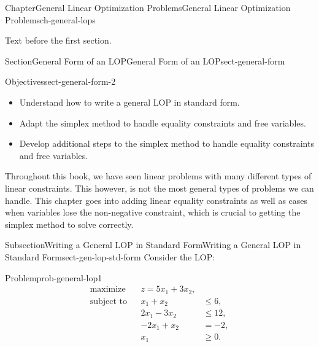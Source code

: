 \documentclass[oneside,10pt,]{book}
\numberwithin{equation}{section}
\newcommand{\amp}{&}
\begin{document}
\begin{chapterptx}{Chapter}{General Linear Optimization Problems}{}{General Linear Optimization Problems}{}{}{ch-general-lops}
\renewcommand*{\chaptername}{Chapter}
\begin{introduction}{}%
Text before the first section.%
\end{introduction}%
%
%
\typeout{************************************************}
\typeout{************************************************}
%
\begin{sectionptx}{Section}{General Form of an LOP}{}{General Form of an LOP}{}{}{sect-general-form}
\begin{objectives}{Objectives}{sect-general-form-2}
%
\begin{itemize}[label=\textbullet]
\item{}Understand how to write a general LOP in standard form.%
\item{}Adapt the simplex method to handle equality constraints and free variables.%
\item{}Develop additional steps to the simplex method to handle equality constraints and free variables.%
\end{itemize}
\end{objectives}
\begin{introduction}{}%
Throughout this book, we have seen linear problems with many different types of linear constraints. This however, is not the most general types of problems we can handle. This chapter goes into adding linear equality constraints as well as cases when variables lose the non-negative constraint, which is crucial to getting the simplex method to solve correctly.%
\end{introduction}%
%
%
\typeout{************************************************}
\typeout{************************************************}
%
\begin{subsectionptx}{Subsection}{Writing a General LOP in Standard Form}{}{Writing a General LOP in Standard Form}{}{}{sect-gen-lop-std-form}
Consider the LOP:%
\begin{problem}{Problem}{}{prob-general-lop1}%
%
\begin{equation}
\begin{aligned} \text{maximize} \amp\amp z=5x_1+3x_2, \amp  \\ \text{subject to} \amp\amp x_1 + x_2 \amp\leq 6, \\ \amp\amp 2x_1 - 3x_2 \amp\leq 12, \\ \amp\amp -2x_1 +x_2 \amp = -2, \\ \amp\amp x_1 \amp \geq 0.

\end{aligned}
\end{equation}
\end{problem}
\end{subsectionptx}
\end{sectionptx}
\end{chapterptx}
\end{document}
